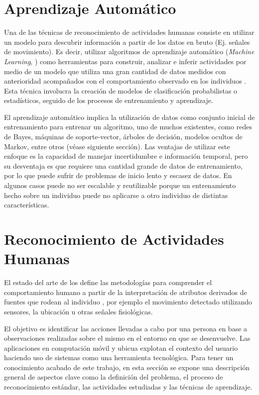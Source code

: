 \section{Aprendizaje Automático}

\label{sec25:aprendizaje-automatico}Una de las técnicas de reconocimiento
de actividades humanas consiste en utilizar un modelo para descubrir
información a partir de los datos en bruto (Ej. señales de movimiento).
Es decir, utilizar algoritmos de aprendizaje automático (\emph{Machine
Learning}, ) como herramientas para construir, analizar
e inferir actividades por medio de un modelo que utiliza una gran
cantidad de datos medidos con anterioridad acompañados con el comportamiento
observado en los individuos \cite{Chen2012}. Esta técnica involucra
la creación de modelos de clasificación probabilistas o estadísticos,
seguido de los procesos de entrenamiento y aprendizaje.

El aprendizaje automático implica la utilización de datos como conjunto
inicial de entrenamiento para entrenar un algoritmo, uno de muchos
existentes, como redes de Bayes, máquinas de soporte-vector, árboles
de decisión, modelos ocultos de Markov, entre otros \cite{Rajaraman2011}
(véase siguiente sección). Las ventajas de utilizar este enfoque es
la capacidad de manejar incertidumbre e información temporal, pero
su desventaja es que requiere una cantidad grande de datos de entrenamiento,
por lo que puede sufrir de problemas de inicio lento y escasez de
datos. En algunos casos puede no ser escalable y reutilizable porque
un entrenamiento hecho sobre un individuo puede no aplicarse a otro
individuo de distintas características.

\section{Reconocimiento de Actividades Humanas}

El estado del arte de los  define las metodologías para
comprender el comportamiento humano a partir de la interpretación
de atributos derivados de fuentes que rodean al individuo \cite{Bao2004,Poppe2007},
por ejemplo el movimiento detectado utilizando sensores, la ubicación
u otras señales fisiológicas. 

El objetivo es identificar las acciones llevadas a cabo por una persona
en base a observaciones realizadas sobre el mismo en el entorno en
que se desenvuelve. Las aplicaciones en computación móvil y ubicua
explotan el contexto del usuario haciendo uso de sistemas 
como una herramienta tecnológica. Para tener un conocimiento acabado
de este trabajo, en esta sección se expone una descripción general
de aspectos clave como la definición del problema, el proceso de reconocimiento
estándar, las actividades estudiadas y las técnicas de aprendizaje.

